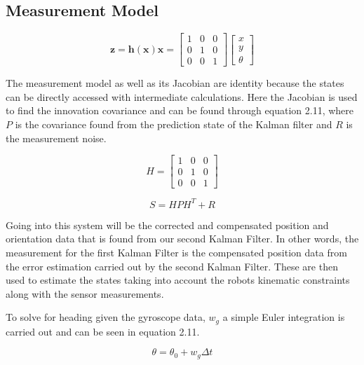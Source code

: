\subsection{Measurement Model}

\begin{equation}
  \boldsymbol{z} = \boldsymbol{h(x)x} =  
  \begin{bmatrix}
    1 & 0 &  0 \\
    0 & 1 &  0 \\
    0 & 0 &  1
  \end{bmatrix}
  \begin{bmatrix}
    x \\
    y \\
    \theta
\end{bmatrix}
\end{equation}

The measurement model as well as its Jacobian are identity because the states can 
be directly accessed with intermediate calculations. Here the Jacobian is used to 
find the innovation covariance and can be found through equation 2.11, where $P$ is 
the covariance found from the prediction state of the Kalman filter and $R$ is the 
measurement noise.

\begin{equation}
  H = \begin{bmatrix}
    1 & 0 & 0 \\
    0 & 1 & 0 \\
    0 & 0 & 1
  \end{bmatrix}
\end{equation}

\begin{equation}
  S = HPH^T + R
\end{equation}

Going into this system will be the corrected and compensated position and 
orientation data that is found from our second Kalman Filter. In other words, the 
measurement for the first Kalman Filter is the compensated position data from the 
error estimation carried out by the second Kalman 
Filter. These are then used to estimate the states taking into account the robots 
kinematic constraints along with the sensor measurements.  

To solve for heading given the gyroscope data, $w_g$ a simple Euler integration is carried 
out and can be seen in equation 2.11. 

\begin{equation}
  \theta = \theta_0 + w_g \Delta t
\end{equation}

